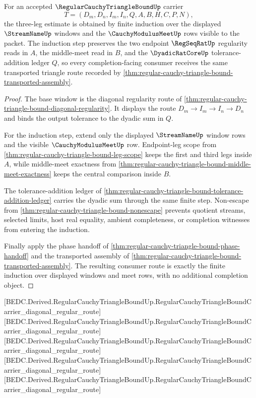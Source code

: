 \begin{theorem}
\label{thm:regular-cauchy-triangle-bound-induction-scope}
For an accepted $\RegularCauchyTriangleBoundUp$ carrier
$$
T=(D_m,D_n,I_m,I_n,Q,A,B,H,C,P,N),
$$
the three-leg estimate is obtained by finite induction over the displayed $\StreamNameUp$ windows and the $\CauchyModulusMeetUp$ rows visible to the packet. The induction step preserves the two endpoint $\RegSeqRatUp$ regularity reads in $A$, the middle-meet read in $B$, and the $\DyadicRatCoreUp$ tolerance-addition ledger $Q$, so every completion-facing consumer receives the same transported triangle route recorded by \autoref{thm:regular-cauchy-triangle-bound-transported-assembly}.
\end{theorem}
\begin{proof}
The base window is the diagonal regularity route of \autoref{thm:regular-cauchy-triangle-bound-diagonal-regularity}. It displays the route $D_m \longrightarrow I_m \longrightarrow I_n \longrightarrow D_n$ and binds the output tolerance to the dyadic sum in $Q$.

For the induction step, extend only the displayed $\StreamNameUp$ window rows and the visible $\CauchyModulusMeetUp$ row. Endpoint-leg scope from \autoref{thm:regular-cauchy-triangle-bound-leg-scope} keeps the first and third legs inside $A$, while middle-meet exactness from \autoref{thm:regular-cauchy-triangle-bound-middle-meet-exactness} keeps the central comparison inside $B$.

The tolerance-addition ledger of \autoref{thm:regular-cauchy-triangle-bound-tolerance-addition-ledger} carries the dyadic sum through the same finite step. Non-escape from \autoref{thm:regular-cauchy-triangle-bound-nonescape} prevents quotient streams, selected limits, host real equality, ambient completeness, or completion witnesses from entering the induction.

Finally apply the phase handoff of \autoref{thm:regular-cauchy-triangle-bound-phase-handoff} and the transported assembly of \autoref{thm:regular-cauchy-triangle-bound-transported-assembly}. The resulting consumer route is exactly the finite induction over displayed windows and meet rows, with no additional completion object.
\end{proof}

[BEDC.Derived.RegularCauchyTriangleBoundUp.RegularCauchyTriangleBoundCarrier\_diagonal\_regular\_route]
[BEDC.Derived.RegularCauchyTriangleBoundUp.RegularCauchyTriangleBoundCarrier\_diagonal\_regular\_route]
[BEDC.Derived.RegularCauchyTriangleBoundUp.RegularCauchyTriangleBoundCarrier\_diagonal\_regular\_route]
[BEDC.Derived.RegularCauchyTriangleBoundUp.RegularCauchyTriangleBoundCarrier\_diagonal\_regular\_route]
[BEDC.Derived.RegularCauchyTriangleBoundUp.RegularCauchyTriangleBoundCarrier\_diagonal\_regular\_route]

